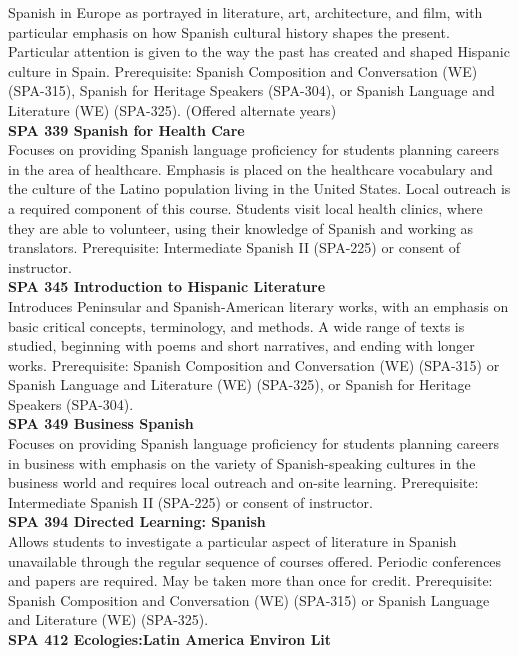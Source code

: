 \documentclass[
  letterpaper,
]{scrbook}
\begin{document}
Spanish in Europe as portrayed in literature, art, architecture, and
film, with particular emphasis on how Spanish cultural history shapes
the present. Particular attention is given to the way the past has
created and shaped Hispanic culture in Spain. Prerequisite: Spanish
Composition and Conversation (WE) (SPA-315), Spanish for Heritage
Speakers (SPA-304), or Spanish Language and Literature (WE) (SPA-325).
(Offered alternate years)\\
\textbf{SPA 339 Spanish for Health Care}\\
Focuses on providing Spanish language proficiency for students planning
careers in the area of healthcare. Emphasis is placed on the healthcare
vocabulary and the culture of the Latino population living in the United
States. Local outreach is a required component of this course. Students
visit local health clinics, where they are able to volunteer, using
their knowledge of Spanish and working as translators. Prerequisite:
Intermediate Spanish II (SPA-225) or consent of instructor.\\
\textbf{SPA 345 Introduction to Hispanic Literature}\\
Introduces Peninsular and Spanish-American literary works, with an
emphasis on basic critical concepts, terminology, and methods. A wide
range of texts is studied, beginning with poems and short narratives,
and ending with longer works. Prerequisite: Spanish Composition and
Conversation (WE) (SPA-315) or Spanish Language and Literature (WE)
(SPA-325), or Spanish for Heritage Speakers (SPA-304).\\
\textbf{SPA 349 Business Spanish}\\
Focuses on providing Spanish language proficiency for students planning
careers in business with emphasis on the variety of Spanish-speaking
cultures in the business world and requires local outreach and on-site
learning. Prerequisite: Intermediate Spanish II (SPA-225) or consent of
instructor.\\
\textbf{SPA 394 Directed Learning: Spanish}\\
Allows students to investigate a particular aspect of literature in
Spanish unavailable through the regular sequence of courses offered.
Periodic conferences and papers are required. May be taken more than
once for credit. Prerequisite: Spanish Composition and Conversation (WE)
(SPA-315) or Spanish Language and Literature (WE) (SPA-325).\\
\textbf{SPA 412 Ecologies:Latin America Environ Lit}\\
\end{document}
